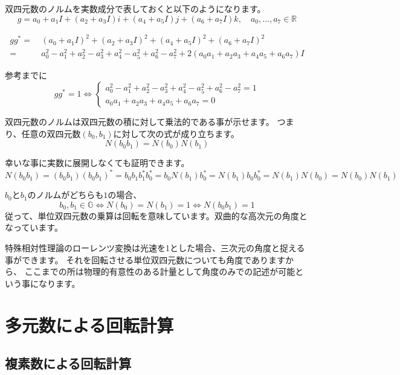 \documentclass[a4paper,12pt]{jsreport}
\begin{document}
双四元数のノルムを実数成分で表しておくと以下のようになります。
\begin{equation}
g=a_0+a_1I+(a_2+a_3I)i+(a_4+a_5I)j+(a_6+a_7I)k,\quad a_0,..., a_7\in\mathbb{R}
\end{equation}

\begin{equation}
\begin{split}
gg^*=~&(a_0+a_1I)^2+(a_2+a_3I)^2+(a_4+a_5I)^2+(a_6+a_7I)^2\\
=~&a_0^2-a_1^2+a_2^2-a_3^2+a_4^2-a_5^2+a_6^2-a_7^2+2(a_0a_1+a_2a_3+a_4a_5+a_6a_7)I
\end{split}
\end{equation}

参考までに
\begin{equation}
gg^*=1\iff
\begin{cases}
a_0^2-a_1^2+a_2^2-a_3^2+a_4^2-a_5^2+a_6^2-a_7^2=1\\
a_0a_1+a_2a_3+a_4a_5+a_6a_7=0
\end{cases}
\end{equation}

双四元数のノルムは双四元数の積に対して乗法的である事が示せます。
つまり、任意の双四元数$(b_0,b_1)$に対して次の式が成り立ちます。
\begin{equation}
N(b_0b_1)=N(b_0)N(b_1)
\end{equation}

幸いな事に実数に展開しなくても証明できます。
\begin{equation}
N(b_0b_1)=(b_0b_1)(b_0b_1)^*=b_0b_1b_1^*b_0^*=b_0N(b_1)b_0^*=N(b_1)b_0b_0^*=N(b_1)N(b_0)=N(b_0)N(b_1)
\end{equation}

$b_0$と$b_1$のノルムがどちらも$1$の場合、
\begin{equation}
b_0,b_1\in\mathbb{G}\iff N(b_0)=N(b_1)=1\iff N(b_0b_1)=1
\end{equation}
従って、単位双四元数の乗算は回転を意味しています。双曲的な高次元の角度となっています。

特殊相対性理論のローレンツ変換は光速を1とした場合、三次元の角度と捉える事ができます。
それを回転させる単位双四元数についても角度でありますから、
ここまでの所は物理的有意性のある計量として角度のみでの記述が可能という事になります。

\chapter{多元数による回転計算}

\section{複素数による回転計算}
\end{document}
